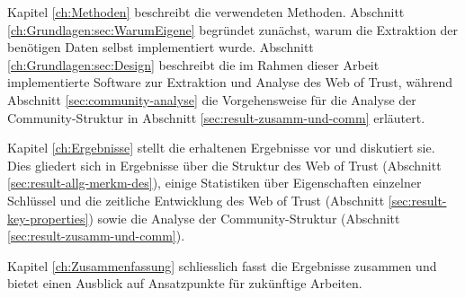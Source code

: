 Kapitel \ref{ch:Methoden} beschreibt die verwendeten
Methoden. Abschnitt \ref{ch:Grundlagen:sec:WarumEigene} begr\"undet
zun\"achst, warum die Extraktion der ben\"otigen Daten selbst
implementiert wurde. Abschnitt \ref{ch:Grundlagen:sec:Design} beschreibt die
im Rahmen dieser Arbeit implementierte Software zur Extraktion und
Analyse des Web of Trust, w\"ahrend Abschnitt
\ref{sec:community-analyse} die Vorgehensweise f\"ur die Analyse der
Community-Struktur in Abschnitt \ref{sec:result-zusamm-und-comm}
erl\"autert.

Kapitel \ref{ch:Ergebnisse} stellt die erhaltenen Ergebnisse vor und
diskutiert sie. Dies gliedert sich in Ergebnisse \"uber die Struktur
des Web of Trust (Abschnitt \ref{sec:result-allg-merkm-des}), einige
Statistiken \"uber Eigenschaften einzelner Schl\"ussel und die
zeitliche Entwicklung des Web of Trust (Abschnitt
\ref{sec:result-key-properties}) sowie die Analyse der
Community-Struktur (Abschnitt \ref{sec:result-zusamm-und-comm}).

Kapitel \ref{ch:Zusammenfassung} schliesslich fasst die Ergebnisse
zusammen und bietet einen Ausblick auf Ansatzpunkte f\"ur zuk\"unftige
Arbeiten.

